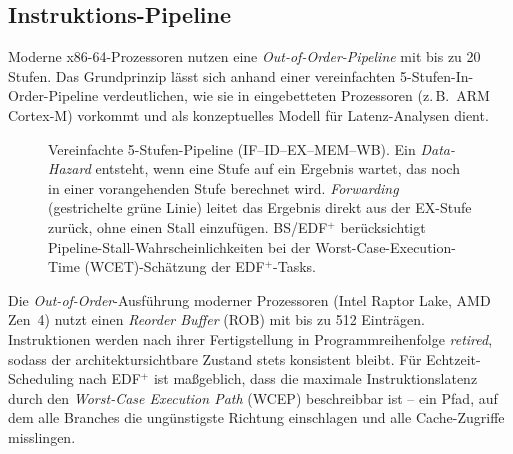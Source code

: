 ﻿\documentclass[a4paper,12pt]{scrreprt}
\theoremstyle{definition}
\begin{document}
	\subsection{Instruktions-Pipeline}

	Moderne x86-64-Prozessoren nutzen eine \emph{Out-of-Order-Pipeline} mit bis zu
	20 Stufen. Das Grundprinzip lässt sich anhand einer vereinfachten
	5-Stufen-In-Order-Pipeline verdeutlichen, wie sie in eingebetteten Prozessoren
	(z.\,B.\ ARM Cortex-M) vorkommt und als konzeptuelles Modell für
	Latenz-Analysen dient.

	\begin{figure}[H]
		\centering
		\caption{Vereinfachte 5-Stufen-Pipeline (IF--ID--EX--MEM--WB). Ein
			\emph{Data-Hazard} entsteht, wenn eine Stufe auf ein Ergebnis wartet,
			das noch in einer vorangehenden Stufe berechnet wird. \emph{Forwarding}
			(gestrichelte grüne Linie) leitet das Ergebnis direkt aus der EX-Stufe
			zurück, ohne einen Stall einzufügen. BS/EDF$^+$ berücksichtigt
			Pipeline-Stall-Wahrscheinlichkeiten bei der Worst-Case-Execution-Time
			(WCET)-Schätzung der EDF$^+$-Tasks.}
		\label{fig:pipeline}
	\end{figure}

	Die \emph{Out-of-Order}-Ausführung moderner Prozessoren (Intel Raptor Lake,
	AMD Zen~4) nutzt einen \emph{Reorder Buffer} (ROB) mit bis zu 512 Einträgen.
	Instruktionen werden nach ihrer Fertigstellung in Programm\-reihenfolge
	\emph{retired}, sodass der architektursichtbare Zustand stets konsistent bleibt.
	Für Echtzeit-Scheduling nach EDF$^+$ ist maßgeblich, dass die maximale
	Instruktionslatenz durch den \emph{Worst-Case Execution Path} (WCEP)
	beschreibbar ist -- ein Pfad, auf dem alle Branches die ungünstigste
	Richtung einschlagen und alle Cache-Zugriffe misslingen.
\end{document}
